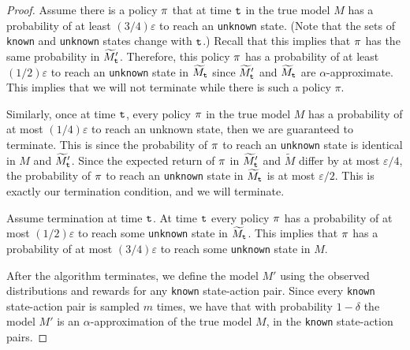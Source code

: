 \begin{proof}
Assume there is a policy $\pi$ that at time ${\tt t}$ in the true
model $M$ has a probability of at least $(3/4)\varepsilon$ to reach
an \texttt{unknown} state. (Note that the sets of \texttt{known} and \texttt{unknown} states
change with ${\tt t}$.) Recall that this implies that $\pi$ has
the same probability in $\widetilde{M}'_{\tt t}$. Therefore, this policy $\pi$
has a probability of at least $(1/2)\varepsilon$ to reach an \texttt{unknown}
state in $\widetilde{M}_{\tt t}$ since $\widetilde{M}'_{\tt t}$ and
$\widetilde{M}_{\tt t}$ are $\alpha$-approximate. This implies that we will not terminate while there is such a policy $\pi$.

Similarly, once at time ${\tt t}$, every policy $\pi$ in the true
model $M$ has a probability of at most $(1/4)\varepsilon$ to reach an
unknown state, then we are guaranteed to terminate. This is since the
probability of $\pi$ to reach an \texttt{unknown} state is identical in
$M$ and $\widetilde{M}'_{\tt t}$. Since the expected return of $\pi$
in $\widetilde{M}'_{\tt t}$ and $\widetilde{M}$ differ by at most
$\varepsilon/4$, the probability of $\pi$ to reach an \texttt{unknown}
state in $\widetilde{M}_{\tt t}$ is at most $\varepsilon/2$. This is
exactly our termination condition, and we will terminate.
%



Assume termination at time ${\tt t}$. At time ${\tt t}$ every policy
$\pi$ has a probability of at most $(1/2)\varepsilon$ to reach
some \texttt{unknown} state in $\widetilde{M}_{\tt t}$. This implies that
$\pi$ has a probability of at most $(3/4)\varepsilon$ to reach
some \texttt{unknown} state in $M$.



After the algorithm terminates, we define the model $M'$ using the
observed distributions and rewards for any \texttt{known} state-action pair.
Since every \texttt{known} state-action pair is sampled $m$ times, we have
that with probability $1-\delta$ the model $M'$
is an $\alpha$-approximation of the true model $M$, in the \texttt{known}
state-action pairs.


\end{proof}
